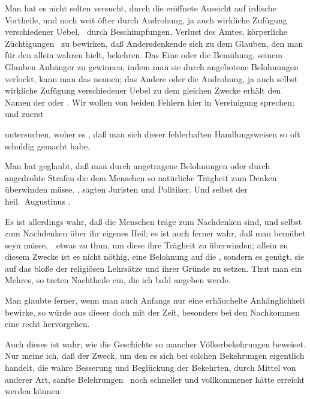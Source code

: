 \begin{aufza} 
\item Man hat es nicht selten versucht, durch die eröffnete Aussicht auf irdische Vortheile, und noch weit öfter durch Androhung, ja auch wirkliche Zufügung verschiedener Uebel, \zB\ durch Beschimpfungen, Verlust des Amtes, körperliche Züchtigungen \udgl\ zu bewirken, daß Andersdenkende sich zu dem Glauben, den man für den allein wahren hielt, bekehren. Das Eine oder die Bemühung, seinem Glauben Anhänger zu gewinnen, indem man sie durch angebotene Belohnungen verlockt, kann man das  nennen; das Andere oder die Androhung, ja auch selbst wirkliche Zufügung verschiedener Uebel zu dem gleichen Zwecke erhält den Namen der  oder . Wir wollen von beiden Fehlern hier in Vereinigung sprechen; und zuerst
\item untersuchen, woher es , daß man sich dieser fehlerhaften Handlungsweisen so oft schuldig gemacht habe.
\begin{aufzb}
\item Man hat geglaubt, daß man durch angetragene Belohnungen oder durch angedrohte Strafen die dem Menschen so natürliche Trägheit zum Denken überwinden müsse. , sagten Juristen und Politiker. Und selbst der heil.\ Augustinus .
\begin{RWanm}
Es ist allerdings wahr, daß die Menschen träge zum Nachdenken sind, und selbst zum Nachdenken über ihr eigenes Heil; es ist auch ferner wahr, daß man bemühet seyn müsse,~\ etwas zu thun, um diese ihre Trägheit zu überwinden; allein zu diesem Zwecke ist es nicht nöthig, eine Belohnung auf die , sondern es genügt, sie auf das bloße  der religiösen Lehrsätze und ihrer Gründe zu setzen. Thut man ein Mehres, so treten Nachtheile ein, die ich bald angeben werde.
\end{RWanm}
\item Man glaubte ferner, wenn man auch Anfangs nur eine erhäuchelte Anhänglichkeit bewirke, so würde aus dieser doch mit der Zeit, besonders bei den Nachkommen eine recht  hervorgehen.
\begin{RWanm}
Auch dieses ist wahr; wie die Geschichte so mancher Völkerbekehrungen beweiset. Nur meine ich, daß der Zweck, um den es sich bei solchen Bekehrungen eigentlich handelt, die wahre Besserung und Beglückung der Bekehrten, durch Mittel von anderer Art, sanfte Belehrungen \udgl\ noch schneller und vollkommener hätte erreicht werden können.

\end{RWanm}
\end{aufzb}
\end{aufza}
